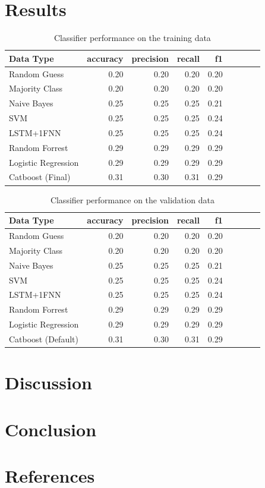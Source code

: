 \documentclass{article}
\begin{document}
	\section{Results}


	\begin{table}[h!]
		\centering
		\caption{Classifier performance on the training data}
		\label{table:results_valid}
		
		\begin{tabular}{lrrrrrrrr}
			\toprule
			Data Type &     accuracy &     precision &     recall &    f1 \\
			\midrule
			Random Guess   &  0.20 &  0.20 &   0.20 &  0.20 \\
			Majority Class &    0.20 &  0.20 &   0.20 &   0.20 \\
			Naive Bayes       &   0.25 & 0.25 &  0.25 &  0.21 \\
			SVM      &   0.25 & 0.25 &  0.25 &  0.24 \\
			LSTM+1FNN  &   0.25 & 0.25 &  0.25 &  0.24 \\
			Random Forrest      &  0.29 & 0.29 & 0.29 &  0.29 \\
			Logistic Regression   &  0.29 & 0.29 &  0.29 &  0.29 \\
			Catboost (Final)   &  0.31 & 0.30 &  0.31 & 0.29 \\
			\bottomrule
		\end{tabular}
		
	\end{table}%



	\begin{table}[h!]
		\centering
		\caption{Classifier performance on the validation data}
		\label{table:results_valid}
		
		\begin{tabular}{lrrrrrrrr}
			\toprule
			Data Type &     accuracy &     precision &     recall &    f1 \\
			\midrule
			Random Guess   &  0.20 &  0.20 &   0.20 &  0.20 \\
			Majority Class &    0.20 &  0.20 &   0.20 &   0.20 \\
			Naive Bayes       &   0.25 & 0.25 &  0.25 &  0.21 \\
			SVM      &   0.25 & 0.25 &  0.25 &  0.24 \\
			LSTM+1FNN  &   0.25 & 0.25 &  0.25 &  0.24 \\
			Random Forrest      &  0.29 & 0.29 & 0.29 &  0.29 \\
			Logistic Regression   &  0.29 & 0.29 &  0.29 &  0.29 \\
			Catboost (Default)   &  0.31 & 0.30 &  0.31 & 0.29 \\
			\bottomrule
		\end{tabular}
		
	\end{table}%


	\section{Discussion}
	
	\section{Conclusion}
	
	\section{References}
	
\printbibliography
\end{document}
